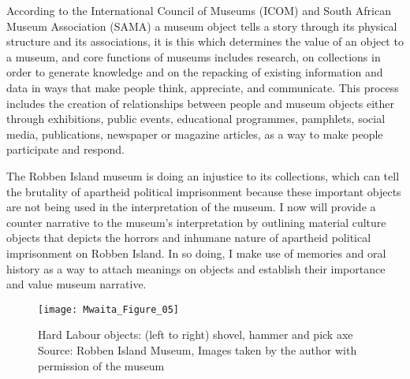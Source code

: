 According to the International Council of Museums (ICOM) and South African Museum Association (SAMA) a museum object tells a story through its physical structure and its associations, it is this which determines the value of an object to a museum, and core functions of museums includes research, on collections in order to generate knowledge and on the repacking of existing information and data in ways that make people think, appreciate, and communicate. This process includes the creation of relationships between people and museum objects either through exhibitions, public events, educational programmes, pamphlets, social media, publications, newspaper or magazine articles, as a way to make people participate and respond.

The Robben Island museum is doing an injustice to its collections, which can tell the brutality of apartheid political imprisonment because these important objects are not being used in the interpretation of the museum. I now will provide a counter narrative to the museum’s interpretation by outlining material culture objects that depicts the horrors and inhumane nature of apartheid political imprisonment on Robben Island. In so doing, I make use of memories and oral history as a way to attach meanings on objects and establish their importance and value museum narrative.



\begin{figure}[!tb]
	\texttt{[image: Mwaita\_Figure\_05]}
	\caption{Hard Labour objects: (left to right) shovel, hammer and pick axe
  {\normalfont\scriptsize \\ Source: Robben Island Museum, Images taken by the author with permission of the museum
                    }}
	\label{fig:Mwaita_Figure_05}
\end{figure}


